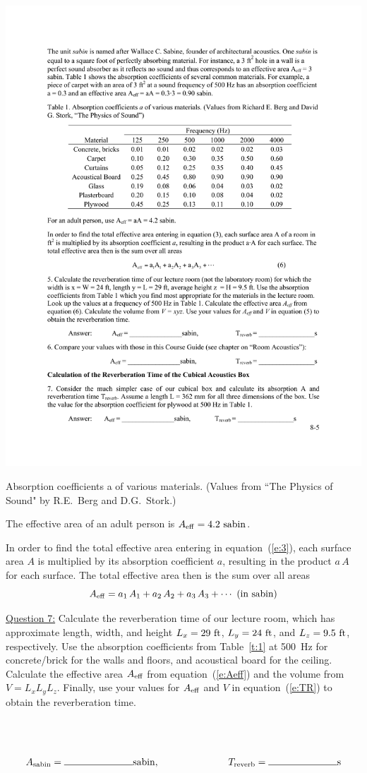 \documentclass[11pt]{NSF}
\def\be{\begin{equation}}
\def\ee{\end{equation}}
\begin{document}
%
\begin{table}[hbtp]
\begin{center}
\includegraphics[width=.8\textwidth]{tab8_1}
\caption{Absorption coefficients a of various materials. 
(Values from ``The Physics of Sound" by R.E.~Berg and D.G.~Stork.)}
\label{t:1}
\end{center}
\end{table}
%
The effective area of an adult person is $A_{\rm eff} = 4.2~{\rm sabin}$.

In order to find the total effective area entering in
equation~(\ref{e:3}), each surface area $A$ is multiplied by 
its absorption coefficient $a$, resulting in the
product $a\, A$ for each surface. 
The total effective area then is the sum over all areas
%
\be
A_{\rm eff} = a_1\,A_1 + a_2\,A_2 + a_3\,A_3 + \cdots
~(\textrm{in sabin})
\label{e:Aeff}
\ee

\underline{Question 7:} Calculate the reverberation time of our lecture room, which has
approximate
length, width, and height $L_x=29~{\rm ft}$, $L_y=24~{\rm ft}$, and 
$L_z=9.5~{\rm ft}$, respectively.
Use the absorption coefficients from Table~\ref{t:1} at 500~Hz
for concrete/brick for the walls and floors, and acoustical board
for the ceiling.
Calculate the effective area $A_{\rm eff}$ from
equation~(\ref{e:Aeff}) and the volume from $V = L_xL_yL_z$. 
Finally, use your values for $A_{\rm eff}$ and $V$ in
equation~(\ref{e:TR}) to
obtain the reverberation time.
\\
\\
\\
\\
\[A_{\rm sabin} = \rule{2.5cm}{0.15mm}{\rm sabin}, \rule{2.5cm}{0.0mm} 
T_{\rm reverb} = \rule{2.5cm}{0.15mm}{\rm s}\]
\end{document}
